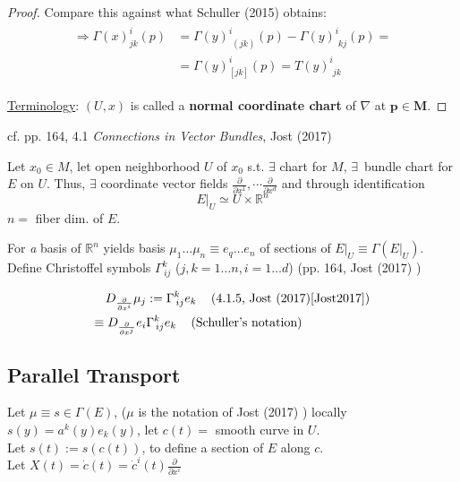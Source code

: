 \documentclass[10pt]{amsart}
\begin{document}
\begin{multicols*}{2}
\begin{proof}
Compare this against what Schuller (2015) \cite{Schul2015} obtains:
	\[
	\begin{gathered}
		\begin{aligned} 
			\Longrightarrow \Gamma(x)^i_{jk}(p) & = \Gamma(y)^i_{\,\, (jk)}(p)  -  \Gamma(y)^i_{\,\, kj}(p) =  \\
			& = \Gamma(y)^i_{[jk]}(p) = T(y)^i_{\,\,jk}
		\end{aligned} 
	\end{gathered}
	\]
	
	\underline{Terminology}: $(U,x)$ is called a \textbf{normal coordinate chart} of $\nabla$ at {$\mathbf{p\in M}$}.
	
\end{proof}



cf. pp. 164, 4.1 \emph{Connections in Vector Bundles}, Jost (2017) \cite{Jost2017}

Let $x_0 \in M$, let open neighborhood $U$ of $x_0$ s.t. $\exists$ chart for $M$, $\exists\,$ bundle chart for $E$ on $U$. Thus, $\exists$ coordinate vector fields $\frac{\partial }{ \partial x^1} , \cdots \frac{\partial }{ \partial x^d}$ and through identification
\[
\left. E \right|_U \simeq U \times \mathbb{R}^n
\]
$n = $ fiber dim. of $E$.

For \emph{a} basis of $\mathbb{R}^n$ yields basis $\mu_1 \dots \mu_n \equiv e_q \dots e_n$ of sections of $\left. E \right|_U \equiv \Gamma(\left. E \right|_U )$. Define Christoffel symbols $\Gamma^k_{\, ij}$ ($j,k =1\dots n, i =1 \dots d$) (pp. 164, Jost (2017) \cite{Jost2017}) 

\begin{equation}
	\begin{aligned}
		D_{\frac{\partial}{\partial x^i} } \mu_j & := \Gamma^k_{\, ij} e_k \quad \, (\text{4.1.5, Jost (2017)\cite{Jost2017}}) \\
		\equiv D_{\frac{\partial}{\partial x^j} } e_i & \Gamma^k_{\, ij} e_k \quad \, (\text{Schuller's notation})\\
	\end{aligned}
\end{equation}

\subsection{Parallel Transport}

Let $\mu \equiv s \in \Gamma(E)$, ($\mu$ is the notation of Jost (2017) \cite{Jost2017}) locally $s(y) = a^k(y) e_k(y)$, let $c(t) =$ smooth curve in $U$. \\
Let $s(t):= s(c(t))$, to define a section of $E$ along $c$. \\
Let $X(t) = \dot{c}(t) = \dot{c}^i(t) \frac{\partial}{\partial x^i}$ \\


\end{multicols*}
\end{document}
